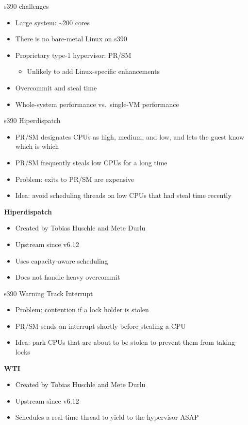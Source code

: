 \documentclass[xetex, table, 10pt,%
aspectratio=169%
]{beamer}
\begin{document}
\begin{frame}{s390 challenges}
\begin{itemize}
  \item Large system: \textasciitilde 200 cores
  \item There is no bare-metal Linux on s390
  \item Proprietary type-1 hypervisor: PR/SM
  \begin{itemize}
    \item Unlikely to add Linux-specific enhancements
  \end{itemize}
  \item Overcommit and steal time
  \item Whole-system performance vs.\ single-VM performance
\end{itemize}
\end{frame}

\begin{frame}{s390 Hiperdispatch}
\begin{itemize}
  \item PR/SM designates CPUs as high, medium, and low, and lets the
    guest know which is which
  \item PR/SM frequently steals low CPUs for a long time
  \item Problem: exits to PR/SM are expensive
  \item Idea: avoid scheduling threads on low CPUs that had steal
    time recently
\end{itemize}
\medskip
\textbf{Hiperdispatch}
\begin{itemize}
  \item Created by Tobias Huschle and Mete Durlu
  \item Upstream since v6.12
  \item Uses capacity-aware scheduling
  \item Does not handle heavy overcommit
\end{itemize}
\end{frame}

\begin{frame}{s390 Warning Track Interrupt}
\begin{itemize}
  \item Problem: contention if a lock holder is stolen
  \item PR/SM sends an interrupt shortly before stealing a CPU
  \item Idea: park CPUs that are about to be stolen to prevent them
    from taking locks
\end{itemize}
\medskip
\textbf{WTI}
\begin{itemize}
  \item Created by Tobias Huschle and Mete Durlu
  \item Upstream since v6.12
  \item Schedules a real-time thread to yield to the hypervisor ASAP
\end{itemize}
\end{frame}
\end{document}
